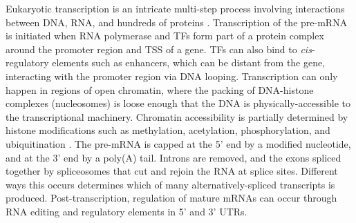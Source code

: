 \begin{outline}
Eukaryotic transcription is an intricate multi-step process involving interactions between DNA, RNA, and hundreds of proteins \autocite{cramer2019OrganizationRegulationGene}.
Transcription of the pre-\gls{mRNA} is initiated when RNA polymerase and \glspl{TF} form part of a protein complex around the promoter region and \gls{TSS} of a gene.
\Glspl{TF} can also bind to \textit{cis}-regulatory elements such as enhancers,
which can be distant from the gene, interacting with the promoter region via DNA looping.
Transcription can only happen in regions of open chromatin, where the packing of DNA-histone complexes (nucleosomes) is loose enough that the DNA is physically-accessible to the transcriptional machinery.
Chromatin accessibility is partially determined by histone modifications such as methylation, acetylation, phosphorylation, and ubiquitination \autocite{bannister2011RegulationChromatinHistone}.
The pre-\gls{mRNA} is capped at the 5' end by a modified nucleotide, and at the 3' end by a poly(A) tail.
Introns are removed, and the exons spliced together by spliceosomes that cut and rejoin the RNA at splice sites.
Different ways this occurs determines which of many alternatively-spliced transcripts is produced.
Post-transcription, regulation of mature \glspl{mRNA} can occur through RNA editing and regulatory elements in 5' and 3' \glspl{UTR}.


\end{outline}

